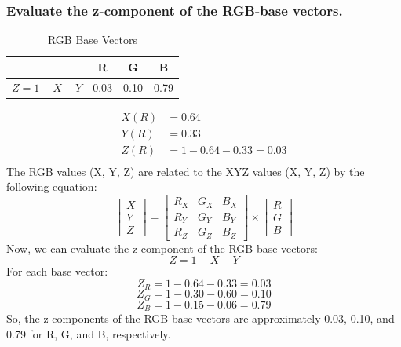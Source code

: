 \documentclass{article}
\begin{document}
\subsubsection*{Evaluate the z-component of the RGB-base vectors.}

\begin{table}[h]
    \centering
    \begin{tabular}{c|c|c|c}
         & R    & G    & B    \\ %
        \hline
        $Z = 1 - X - Y$ & 0.03 & 0.10 & 0.79 \\
    \end{tabular}
    \caption{RGB Base Vectors}
\end{table}
\begin{align*}
    X (R) &= 0.64 \\
    Y (R)&= 0.33 \\
    Z (R) &= 1 - 0.64 - 0.33 = 0.03 \\
\end{align*}
The RGB values (X, Y, Z) are related to the XYZ values (X, Y, Z) by the following equation:
\[
\begin{bmatrix} X \\ Y \\ Z \end{bmatrix} = \begin{bmatrix} R_X & G_X & B_X \\ R_Y & G_Y & B_Y \\ R_Z & G_Z & B_Z \end{bmatrix} \times \begin{bmatrix} R \\ G \\ B \end{bmatrix}
\]
Now, we can evaluate the z-component of the RGB base vectors:
\[
Z = 1 - X - Y
\]
For each base vector:
\[
Z_R = 1 - 0.64 - 0.33 = 0.03
\]
\[
Z_G = 1 - 0.30 - 0.60 = 0.10
\]
\[
Z_B = 1 - 0.15 - 0.06 = 0.79
\]
So, the z-components of the RGB base vectors are approximately 0.03, 0.10, and 0.79 for R, G, and B, respectively.
\end{document}
